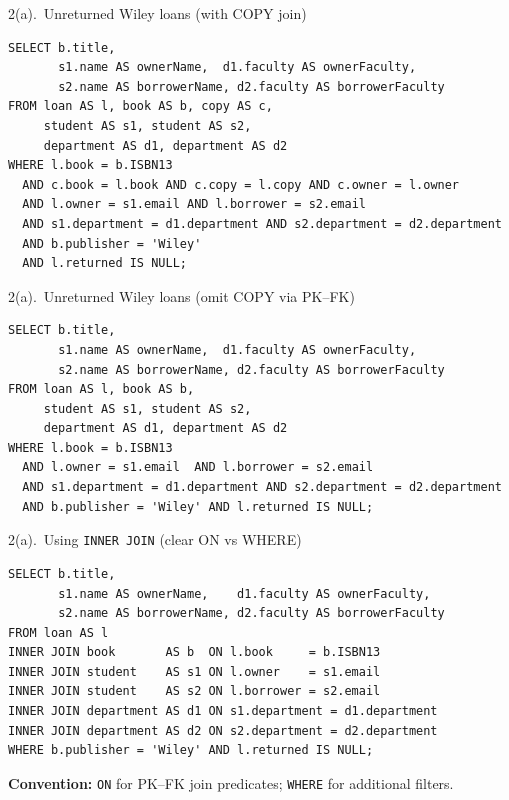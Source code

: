 \documentclass{beamer}
\begin{document}
\begin{frame}[fragile]{2(a).\ Unreturned Wiley loans (with COPY join)}
\small
\begin{lstlisting}[style=sqlcompact]
SELECT b.title,
       s1.name AS ownerName,  d1.faculty AS ownerFaculty,
       s2.name AS borrowerName, d2.faculty AS borrowerFaculty
FROM loan AS l, book AS b, copy AS c,
     student AS s1, student AS s2,
     department AS d1, department AS d2
WHERE l.book = b.ISBN13
  AND c.book = l.book AND c.copy = l.copy AND c.owner = l.owner
  AND l.owner = s1.email AND l.borrower = s2.email
  AND s1.department = d1.department AND s2.department = d2.department
  AND b.publisher = 'Wiley'
  AND l.returned IS NULL;
\end{lstlisting}
\end{frame}

\begin{frame}[fragile]{2(a).\ Unreturned Wiley loans (omit COPY via PK–FK)}
\small
\begin{lstlisting}[style=sqlcompact]
SELECT b.title,
       s1.name AS ownerName,  d1.faculty AS ownerFaculty,
       s2.name AS borrowerName, d2.faculty AS borrowerFaculty
FROM loan AS l, book AS b,
     student AS s1, student AS s2,
     department AS d1, department AS d2
WHERE l.book = b.ISBN13
  AND l.owner = s1.email  AND l.borrower = s2.email
  AND s1.department = d1.department AND s2.department = d2.department
  AND b.publisher = 'Wiley' AND l.returned IS NULL;
\end{lstlisting}
\end{frame}

\begin{frame}[fragile]{2(a).\ Using \texttt{INNER JOIN} (clear ON vs WHERE)}
\small
\begin{lstlisting}[style=sqlcompact]
SELECT b.title,
       s1.name AS ownerName,    d1.faculty AS ownerFaculty,
       s2.name AS borrowerName, d2.faculty AS borrowerFaculty
FROM loan AS l
INNER JOIN book       AS b  ON l.book     = b.ISBN13
INNER JOIN student    AS s1 ON l.owner    = s1.email
INNER JOIN student    AS s2 ON l.borrower = s2.email
INNER JOIN department AS d1 ON s1.department = d1.department
INNER JOIN department AS d2 ON s2.department = d2.department
WHERE b.publisher = 'Wiley' AND l.returned IS NULL;
\end{lstlisting}
\textbf{Convention:} \texttt{ON} for PK–FK join predicates; \texttt{WHERE} for additional filters.
\end{frame}
\end{document}
